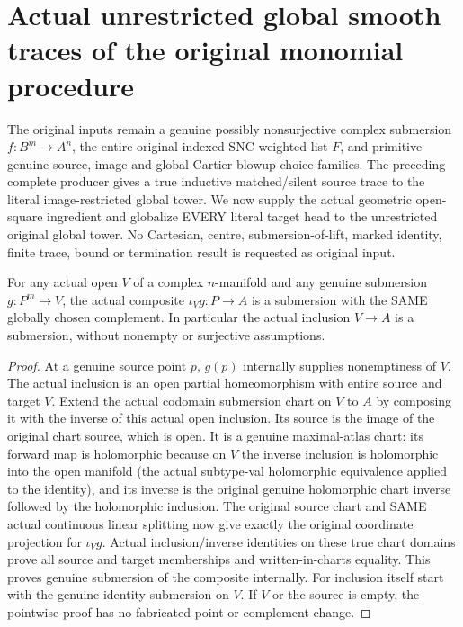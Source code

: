 \section{Actual unrestricted global smooth traces of the original monomial procedure}
The original inputs remain a genuine possibly nonsurjective complex submersion $f:B^m\to A^n$, the entire original indexed SNC weighted list $F$, and primitive genuine source, image and global Cartier blowup choice families. The preceding complete producer gives a true inductive matched/silent source trace to the literal image-restricted global tower. We now supply the actual geometric open-square ingredient and globalize EVERY literal target head to the unrestricted original global tower. No Cartesian, centre, submersion-of-lift, marked identity, finite trace, bound or termination result is requested as original input.

\begin{theorem}
\label{hir:submersion-global-trace-open-charts}
\leanok
{}
\uses{}

For any actual open $V$ of a complex $n$-manifold and any genuine submersion $g:P^m\to V$, the actual composite $\iota_Vg:P\to A$ is a submersion with the SAME globally chosen complement. In particular the actual inclusion $V\to A$ is a submersion, without nonempty or surjective assumptions.
\end{theorem}
\begin{proof}
At a genuine source point $p$, $g(p)$ internally supplies nonemptiness of $V$. The actual inclusion is an open partial homeomorphism with entire source and target $V$. Extend the actual codomain submersion chart on $V$ to $A$ by composing it with the inverse of this actual open inclusion. Its source is the image of the original chart source, which is open. It is a genuine maximal-atlas chart: its forward map is holomorphic because on $V$ the inverse inclusion is holomorphic into the open manifold (the actual subtype-val holomorphic equivalence applied to the identity), and its inverse is the original genuine holomorphic chart inverse followed by the holomorphic inclusion. The original source chart and SAME actual continuous linear splitting now give exactly the original coordinate projection for $\iota_Vg$. Actual inclusion/inverse identities on these true chart domains prove all source and target memberships and written-in-charts equality. This proves genuine submersion of the composite internally. For inclusion itself start with the genuine identity submersion on $V$. If $V$ or the source is empty, the pointwise proof has no fabricated point or complement change.
\end{proof}

